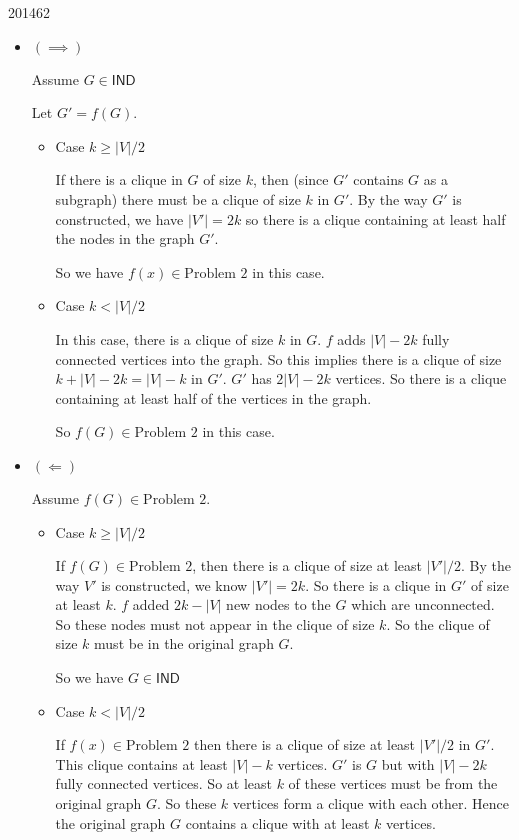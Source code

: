 \documentclass[10pt,\jkfside,a4paper]{article}
\begin{document}
\begin{examquestion}{2014}{6}{2}
\begin{enumerate}[label=(\alph*)]
\begin{enumerate}[label=(\roman*)]
\begin{itemize}

\item $(\implies)$

Assume $G \in \mathsf{IND}$

Let $G' = f(G)$.

\begin{itemize}

\item Case $k \ge |V|/2$

If there is a clique in $G$ of size $k$, then (since $G'$ contains $G$ as a
subgraph) there must be a clique of size $k$ in $G'$. By the way $G'$ is
constructed, we have $|V'| = 2k$ so there is a clique containing at least
half the nodes in the graph $G'$.

So we have $f(x) \in \text{Problem 2}$ in this case.

\item Case $k < |V|/2$

In this case, there is a clique of size $k$ in $G$. $f$ adds $|V| - 2k$
fully connected vertices into the graph. So this implies there is a clique
of size $k + |V| - 2k = |V| - k$ in $G'$. $G'$ has $2|V| - 2k$ vertices. So
there is a clique containing at least half of the vertices in the graph.

So $f(G) \in \text{Problem 2}$ in this case.

\end{itemize}

\item $(\Longleftarrow)$

Assume $f(G) \in \text{Problem 2}$.

\begin{itemize}

\item Case $k \ge |V|/2$

If $f(G) \in \text{Problem 2}$, then there is a clique of size at least
$|V'|/2$. By the way $V'$ is constructed, we know $|V'|=2k$. So there is a
clique in $G'$ of size at least $k$. $f$ added $2k - |V|$ new nodes to the
$G$ which are unconnected. So these nodes must not appear in the clique of
size $k$. So the clique of size $k$ must be in the original graph $G$.

So we have $G \in \mathsf{IND}$

\item Case $k < |V|/2$

If $f(x) \in \text{Problem 2}$ then there is a clique of size at least
$|V'|/2$ in $G'$. This clique contains at least $|V| - k$ vertices.
$G'$ is $G$ but with $|V| - 2k$ fully connected vertices. So at least $k$ of
these vertices must be from the original graph $G$. So these $k$ vertices
form a clique with each other. Hence the original graph $G$ contains a
clique with at least $k$ vertices.


\end{itemize}
\end{itemize}
\end{enumerate}
\end{enumerate}
\end{examquestion}
\end{document}
